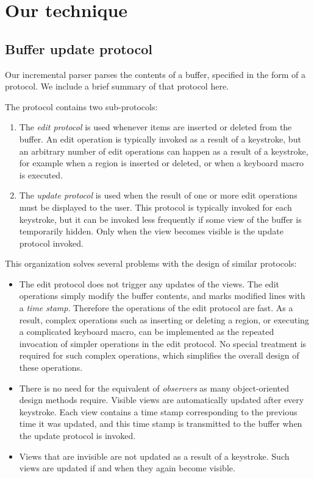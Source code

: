 \section{Our technique}

\subsection{Buffer update protocol}
\label{sec-buffer-update-protocol}

Our incremental parser parses the contents of a buffer, specified in
the form of a \clos{} protocol\cite{Strandh:2016:CPE:3005729.3005732}.
We include a brief summary of that protocol here.

The protocol contains two sub-protocols:

\begin{enumerate}
\item The \emph{edit protocol} is used whenever items are inserted or
  deleted from the buffer.  An edit operation is typically invoked as
  a result of a keystroke, but an arbitrary number of edit operations
  can happen as a result of a keystroke, for example when a region is
  inserted or deleted, or when a keyboard macro is executed.
\item The \emph{update protocol} is used when the result of one or
  more edit operations must be displayed to the user.  This protocol
  is typically invoked for each keystroke, but it can be invoked less
  frequently if some view of the buffer is temporarily hidden.  Only
  when the view becomes visible is the update protocol invoked.
\end{enumerate}

This organization solves several problems with the design of similar
protocols:

\begin{itemize}
\item The edit protocol does not trigger any updates of the views.
  The edit operations simply modify the buffer contents, and marks
  modified lines with a \emph{time stamp}.  Therefore the operations
  of the edit protocol are fast.  As a result, complex operations such
  as inserting or deleting a region, or executing a complicated
  keyboard macro, can be implemented as the repeated invocation of
  simpler operations in the edit protocol.  No special treatment is
  required for such complex operations, which simplifies the overall
  design of these operations.
\item There is no need for the equivalent of \emph{observers} as many
  object-oriented design methods require.  Visible views are
  automatically updated after every keystroke.  Each view contains a
  time stamp corresponding to the previous time it was updated, and
  this time stamp is transmitted to the buffer when the update
  protocol is invoked.
\item Views that are invisible are not updated as a result of a
  keystroke.  Such views are updated if and when they again become
  visible.
\end{itemize}

